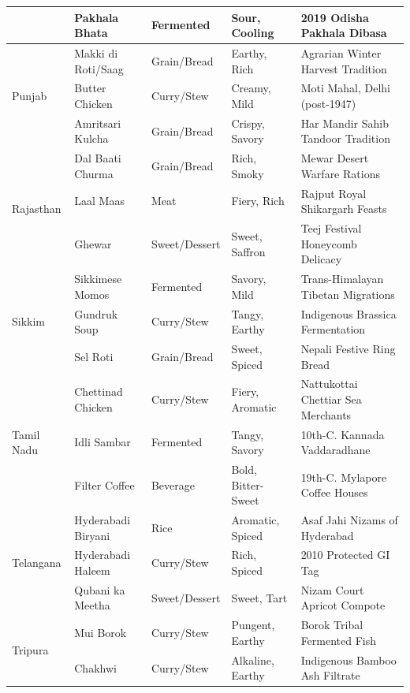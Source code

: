 \documentclass[11pt,a4paper]{report}
\begin{document}
\begin{small}
\begin{longtable}{llllp{4.2cm}}
        & Pakhala Bhata & Fermented & Sour, Cooling & 2019 Odisha Pakhala Dibasa \\
    \midrule
    \multirow{3}{*}{Punjab}
        & Makki di Roti/Saag & Grain/Bread & Earthy, Rich & Agrarian Winter Harvest Tradition \\
        & Butter Chicken & Curry/Stew & Creamy, Mild & Moti Mahal, Delhi (post-1947) \\
        & Amritsari Kulcha & Grain/Bread & Crispy, Savory & Har Mandir Sahib Tandoor Tradition \\
    \midrule
    \multirow{3}{*}{Rajasthan}
        & Dal Baati Churma & Grain/Bread & Rich, Smoky & Mewar Desert Warfare Rations \\
        & Laal Maas & Meat & Fiery, Rich & Rajput Royal Shikargarh Feasts \\
        & Ghewar & Sweet/Dessert & Sweet, Saffron & Teej Festival Honeycomb Delicacy \\
    \midrule
    \multirow{3}{*}{Sikkim}
        & Sikkimese Momos & Fermented & Savory, Mild & Trans-Himalayan Tibetan Migrations \\
        & Gundruk Soup & Curry/Stew & Tangy, Earthy & Indigenous Brassica Fermentation \\
        & Sel Roti & Grain/Bread & Sweet, Spiced & Nepali Festive Ring Bread \\
    \midrule
    \multirow{3}{*}{Tamil Nadu}
        & Chettinad Chicken & Curry/Stew & Fiery, Aromatic & Nattukottai Chettiar Sea Merchants \\
        & Idli Sambar & Fermented & Tangy, Savory & 10th-C. Kannada Vaddaradhane \\
        & Filter Coffee & Beverage & Bold, Bitter-Sweet & 19th-C. Mylapore Coffee Houses \\
    \midrule
    \multirow{3}{*}{Telangana}
        & Hyderabadi Biryani & Rice & Aromatic, Spiced & Asaf Jahi Nizams of Hyderabad \\
        & Hyderabadi Haleem & Curry/Stew & Rich, Spiced & 2010 Protected GI Tag \\
        & Qubani ka Meetha & Sweet/Dessert & Sweet, Tart & Nizam Court Apricot Compote \\
    \midrule
    \multirow{3}{*}{Tripura}
        & Mui Borok & Curry/Stew & Pungent, Earthy & Borok Tribal Fermented Fish \\
        & Chakhwi & Curry/Stew & Alkaline, Earthy & Indigenous Bamboo Ash Filtrate \\

\end{longtable}
\end{small}
\end{document}
